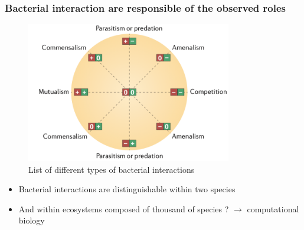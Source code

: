 \documentclass[8pt,usenames,dvipsnames]{beamer}
\begin{document}
\begin{frame}
\frametitle{Bacterial interaction are responsible of the observed roles}

\begin{figure}
	\centering
	\includegraphics[width=0.8\textwidth]{figures/interaction.png}
    \caption{List of different types of bacterial interactions \tiny \citep{Faust2012} }
\end{figure}
\vspace{-0.5cm}
\begin{block}{}
\begin{itemize}
\item Bacterial interactions are distinguishable within two species
\item And within ecosystems composed of thousand of species ? $\rightarrow$ computational biology 
\end{itemize}
\end{block}

\end{frame}
\end{document}
